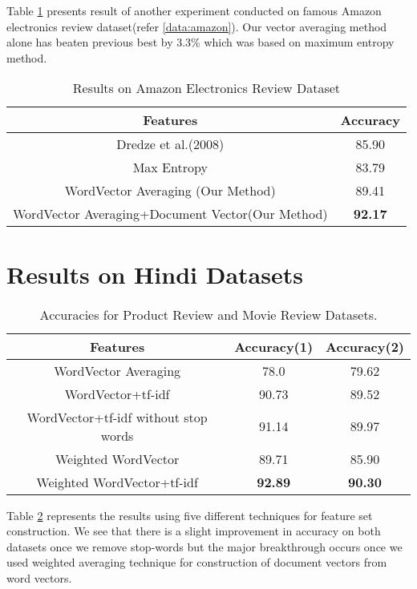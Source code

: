 Table \ref{table:amazon} presents result of another experiment conducted on famous Amazon electronics review dataset(refer \ref{data:amazon}). Our vector averaging method alone has beaten previous best by 3.3\% which was based on maximum entropy method.
\begin {table}[H]
\centering
\begin{tabular}{ | c | c | }
\hline
\textbf{Features} & \textbf{Accuracy} \\ \hline
Dredze et al.(2008) & 85.90\\ \hline
Max Entropy & 83.79\\ \hline
WordVector Averaging (Our Method) & 89.41\\ \hline
WordVector Averaging+Document Vector(Our Method) & \textbf{92.17}\\ \hline
\end{tabular}
\caption {Results on Amazon Electronics Review Dataset}
\label{table:amazon}
\end{table}


\section{Results on Hindi Datasets}
\label{sec:hindi_results}
\begin {table}[h!]
\centering
\begin{tabular}{ | c | c | c | }
\hline
\textbf{Features} & \textbf{Accuracy(1)} & \textbf{Accuracy(2)} \\ \hline
WordVector Averaging & 78.0 & 79.62\\ \hline
WordVector+tf-idf & 90.73 & 89.52\\ \hline
WordVector+tf-idf without stop words & 91.14 & 89.97\\ \hline
Weighted WordVector & 89.71 & 85.90\\ \hline
Weighted WordVector+tf-idf & \textbf{92.89} & \textbf{90.30}\\ \hline
\end{tabular}
\caption {Accuracies for Product Review and Movie Review Datasets.}
\label{table:hindi_ourmethods}
\end{table}

Table \ref{table:hindi_ourmethods} represents the results using five different techniques for feature set construction. We see that there is a slight improvement in accuracy on both datasets once we remove stop-words but the major breakthrough occurs once we used weighted averaging technique for construction of document vectors from word vectors.

